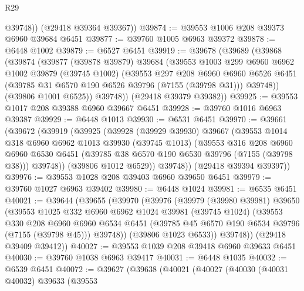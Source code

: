 \begin{lexlean}{R29}
\begin{coremodule}
          @39748))
      (@29418 @39364 @39367))
@39874 := @39553 @1006 @208 @39373 @6960 @39684 @6451
@39877 := @39760 @1005 @6963 @39372
@39878 := @6448 @1002
@39879 := @6527 @6451
@39919 := @39678
    (@39689
      (@39868
        (@39874
          (@39877
            (@39878 @39879)
            @39684
            (@39553
              @1003
              @299
              @6960
              @6962
              @1002
              @39879
              (@39745 @1002)
              (@39553
                @297
                @208
                @6960
                @6960
                @6526
                @6451
                (@39785 @31 @6570 @190 @6526 @39796 (@7155 (@39798 @31)))
                @39748))
            (@39806 @1001 @6525))
          @39748))
      (@29418 @39379 @39382))
@39925 := @39553 @1017 @208 @39388 @6960 @39667 @6451
@39928 := @39760 @1016 @6963 @39387
@39929 := @6448 @1013
@39930 := @6531 @6451
@39970 := @39661
    (@39672
      (@39919
        (@39925
          (@39928
            (@39929 @39930)
            @39667
            (@39553
              @1014
              @318
              @6960
              @6962
              @1013
              @39930
              (@39745 @1013)
              (@39553
                @316
                @208
                @6960
                @6960
                @6530
                @6451
                (@39785 @38 @6570 @190 @6530 @39796 (@7155 (@39798 @38)))
                @39748))
            (@39806 @1012 @6529))
          @39748))
      (@29418 @39394 @39397))
@39976 := @39553 @1028 @208 @39403 @6960 @39650 @6451
@39979 := @39760 @1027 @6963 @39402
@39980 := @6448 @1024
@39981 := @6535 @6451
@40021 := @39644
    (@39655
      (@39970
        (@39976
          (@39979
            (@39980 @39981)
            @39650
            (@39553
              @1025
              @332
              @6960
              @6962
              @1024
              @39981
              (@39745 @1024)
              (@39553
                @330
                @208
                @6960
                @6960
                @6534
                @6451
                (@39785 @45 @6570 @190 @6534 @39796 (@7155 (@39798 @45)))
                @39748))
            (@39806 @1023 @6533))
          @39748))
      (@29418 @39409 @39412))
@40027 := @39553 @1039 @208 @39418 @6960 @39633 @6451
@40030 := @39760 @1038 @6963 @39417
@40031 := @6448 @1035
@40032 := @6539 @6451
@40072 := @39627
    (@39638
      (@40021
        (@40027
          (@40030
            (@40031 @40032)
            @39633
            (@39553

\end{coremodule}
\end{lexlean}
